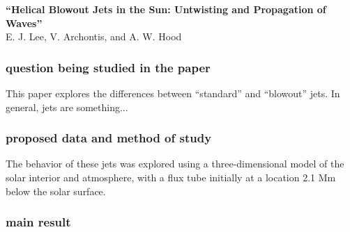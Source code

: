 \documentclass[12pt]{article}
\begin{document}
\begin{center}
    \large\textbf{``Helical Blowout Jets in the Sun:
    Untwisting and Propagation of Waves''}\\
    \normalsize E. J. Lee, V. Archontis, and A. W. Hood
\end{center}

\subsubsection*{question being studied in the paper}
This paper explores the differences between ``standard'' and ``blowout''
jets. In general, jets are something$\ldots$

\subsubsection*{proposed data and method of study}
The behavior of these jets was explored using a three-dimensional model
of the solar interior and atmosphere, with a flux tube initially at a
location 2.1 Mm below the solar surface.

\subsubsection*{main result}
\end{document}
